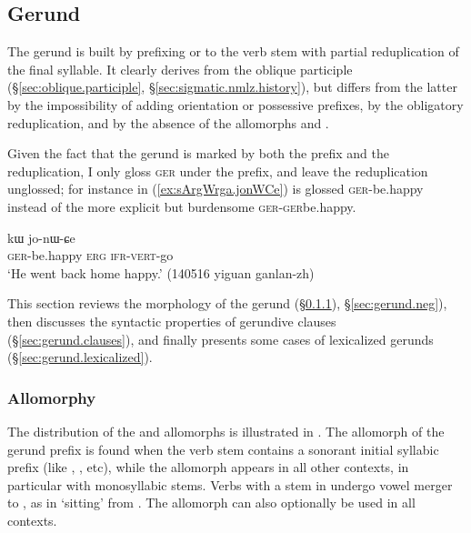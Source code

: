 \subsection{Gerund} \label{sec:gerund}
The gerund is built by prefixing  or  to the verb stem with partial reduplication of the final syllable. It clearly derives from the oblique participle (§\ref{sec:oblique.participle}, §\ref{sec:sigmatic.nmlz.history}), but differs from the latter by the impossibility of adding orientation or possessive prefixes, by the obligatory reduplication, and by the absence of the allomorphs  and . 

Given the fact that the gerund is marked by both the prefix  and the reduplication, I only gloss \textsc{ger} under the prefix, and leave the reduplication unglossed; for instance in (\ref{ex:sArgWrga.jonWCe})  is glossed \textsc{ger}-be.happy instead of the more explicit but burdensome \textsc{ger}-\textsc{ger}\redp{}be.happy.

\begin{exe}
\ex \label{ex:sArgWrga.jonWCe}
 kɯ jo-nɯ-ɕe \\
\textsc{ger}-be.happy \textsc{erg} \textsc{ifr}-\textsc{vert}-go \\
\glt `He went back home happy.' (140516 yiguan ganlan-zh) 
\end{exe}

This section reviews the morphology of the gerund (§\ref{sec:gerund.allomorphs}), §\ref{sec:gerund.neg}), then discusses the syntactic properties of gerundive clauses (§\ref{sec:gerund.clauses}), and finally presents some cases of lexicalized gerunds (§\ref{sec:gerund.lexicalized}).


\subsubsection{Allomorphy} \label{sec:gerund.allomorphs}
The distribution of the  and  allomorphs is illustrated in . The  allomorph of the gerund prefix is found when the verb stem contains a sonorant initial syllabic prefix (like , ,  etc), while the  allomorph appears in all other contexts, in particular with monosyllabic stems. Verbs with a stem in  undergo vowel merger  to , as in  `sitting' from . The  allomorph can also optionally be used in all contexts.

